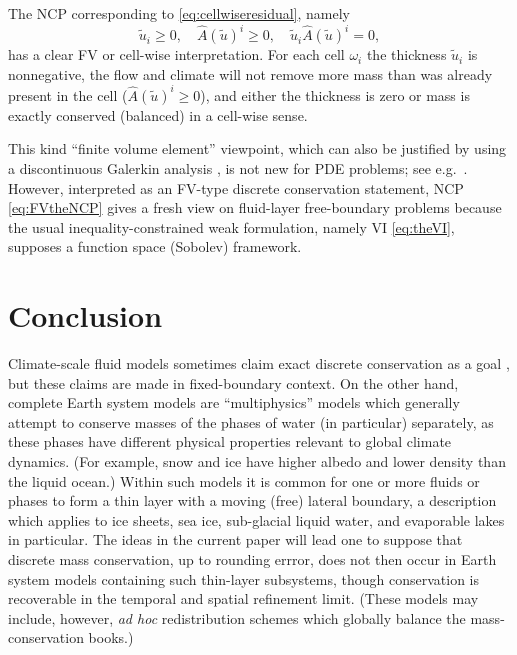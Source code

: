 \documentclass[final,onefignum]{siamart190516}
\begin{document}
The NCP corresponding to \eqref{eq:cellwiseresidual}, namely
\begin{equation}
\tilde u_i \ge 0, \quad \hat A(\tilde u)^i \ge 0, \quad \tilde u_i \hat A(\tilde u)^i = 0, \label{eq:FVtheNCP}
\end{equation}
has a clear FV or cell-wise interpretation.  For each cell $\omega_i$ the thickness $\tilde u_i$ is nonnegative, the flow and climate will not remove more mass than was already present in the cell ($\hat A(\tilde u)^i \ge 0$), and either the thickness is zero or mass is exactly conserved (balanced) in a cell-wise sense.

This kind ``finite volume element'' viewpoint, which can also be justified by using a discontinuous Galerkin analysis \cite{Arnoldetal2002}, is not new for PDE problems; see e.g.~\cite{Cai1990,EwingLinLin2002}.  However, interpreted as an FV-type discrete conservation statement, NCP \eqref{eq:FVtheNCP} gives a fresh view on fluid-layer free-boundary problems because the usual inequality-constrained weak formulation, namely VI \eqref{eq:theVI}, supposes a function space (Sobolev) framework.


\section{Conclusion} \label{sec:conclusion}

Climate-scale fluid models sometimes claim exact discrete conservation as a goal \cite{Ringleretal2013,Thuburn2008}, but these claims are made in fixed-boundary context.  On the other hand, complete Earth system models are ``multiphysics'' models which generally attempt to conserve masses of the phases of water (in particular) separately, as these phases have different physical properties relevant to global climate dynamics.  (For example, snow and ice have higher albedo and lower density than the liquid ocean.)  Within such models it is common for one or more fluids or phases to form a thin layer with a moving (free) lateral boundary, a description which applies to ice sheets, sea ice, sub-glacial liquid water, and evaporable lakes in particular.  The ideas in the current paper will lead one to suppose that discrete mass conservation, up to rounding errror, does not then occur in Earth system models containing such thin-layer subsystems, though conservation is recoverable in the temporal and spatial refinement limit.  (These models may include, however, \emph{ad hoc} redistribution schemes which globally balance the mass-conservation books.)
\end{document}
